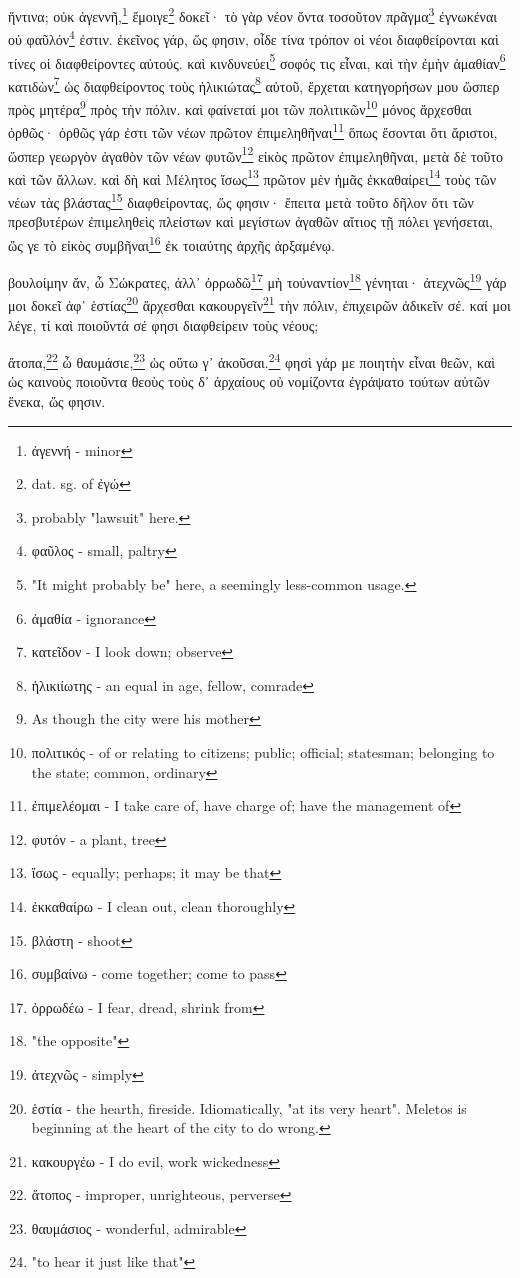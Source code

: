 ἥντινα;
οὐκ
ἀγεννῆ,\footnote{ἀγεννή - minor}
ἔμοιγε\footnote{dat. sg. of ἐγώ}
δοκεῖ·
τὸ
γὰρ
νέον
ὄντα
τοσοῦτον
πρᾶγμα\footnote{probably "lawsuit" here.}
ἐγνωκέναι
οὐ
φαῦλόν\footnote{φαῦλος - small, paltry}
ἐστιν.
ἐκεῖνος
γάρ,
ὥς
φησιν,
οἶδε
τίνα
τρόπον
οἱ
νέοι
διαφθείρονται
καὶ
τίνες
οἱ
διαφθείροντες
αὐτούς.
καὶ
κινδυνεύει\footnote{"It might probably be" here, a seemingly less-common usage.}
σοφός
τις
εἶναι,
καὶ
τὴν
ἐμὴν
ἀμαθίαν\footnote{ἀμαθία - ignorance}
κατιδὼν\footnote{κατεῖδον - I look down; observe}
ὡς
διαφθείροντος
τοὺς
ἡλικιώτας\footnote{ἡλικιίωτης - an equal in age, fellow, comrade}
αὐτοῦ,
ἔρχεται
κατηγορήσων
μου
ὥσπερ
πρὸς
μητέρα\footnote{As though the city were his mother}
πρὸς
τὴν
πόλιν.
καὶ
φαίνεταί
μοι
τῶν
πολιτικῶν\footnote{πολιτικός - of or relating to citizens; public; official; statesman; belonging to the state; common, ordinary}
\versification{[2d]}
μόνος
ἄρχεσθαι
ὀρθῶς·
ὀρθῶς
γάρ
ἐστι
τῶν
νέων
πρῶτον
ἐπιμεληθῆναι\footnote{ἐπιμελέομαι - I take care of, have charge of; have the management of}
ὅπως
ἔσονται
ὅτι
ἄριστοι,
ὥσπερ
γεωργὸν
ἀγαθὸν
τῶν
νέων
φυτῶν\footnote{φυτόν - a plant, tree}
εἰκὸς
πρῶτον
ἐπιμεληθῆναι,
μετὰ
δὲ
τοῦτο
καὶ
τῶν
ἄλλων.
καὶ
δὴ
καὶ
Μέλητος
ἴσως\footnote{ἴσως - equally; perhaps; it may be that}
πρῶτον
\versification{[3a]}
μὲν
ἡμᾶς
ἐκκαθαίρει\footnote{ἐκκαθαίρω - I clean out, clean thoroughly}
τοὺς
τῶν
νέων
τὰς
βλάστας\footnote{βλάστη - shoot}
διαφθείροντας,
ὥς
φησιν·
ἔπειτα
μετὰ
τοῦτο
δῆλον
ὅτι
τῶν
πρεσβυτέρων
ἐπιμεληθεὶς
πλείστων
καὶ
μεγίστων
ἀγαθῶν
αἴτιος
τῇ
πόλει
γενήσεται,
ὥς
γε
τὸ
εἰκὸς
συμβῆναι\footnote{συμβαίνω - come together; come to pass}
ἐκ
τοιαύτης
ἀρχῆς
ἀρξαμένῳ. 






βουλοίμην
ἄν,
ὦ
Σώκρατες,
ἀλλ᾽
ὀρρωδῶ\footnote{ὀρρωδέω - I fear, dread, shrink from}
μὴ
τοὐναντίον\footnote{"the opposite"}
γένηται·
ἀτεχνῶς\footnote{ἀτεχνῶς - simply}
γάρ
μοι
δοκεῖ
ἀφ᾽
ἑστίας\footnote{ἑστία - the hearth, fireside. Idiomatically, "at its very heart". Meletos is beginning at the heart of the city to do wrong.}
ἄρχεσθαι
κακουργεῖν\footnote{κακουργέω - I do evil, work wickedness}
τὴν
πόλιν,
ἐπιχειρῶν
ἀδικεῖν
σέ.
καί
μοι
λέγε,
τί
καὶ
ποιοῦντά
σέ
φησι
διαφθείρειν
τοὺς
νέους; 

\versification{[3b]}
ἄτοπα,\footnote{ἄτοπος - improper, unrighteous, perverse}
ὦ
θαυμάσιε,\footnote{θαυμάσιος - wonderful, admirable}
ὡς
οὕτω
γ᾽
ἀκοῦσαι.\footnote{"to hear it just like that"}
φησὶ
γάρ
με
ποιητὴν
εἶναι
θεῶν,
καὶ
ὡς
καινοὺς
ποιοῦντα
θεοὺς
τοὺς
δ᾽
ἀρχαίους
οὐ
νομίζοντα
ἐγράψατο
τούτων
αὐτῶν
ἕνεκα,
ὥς
φησιν.

